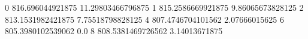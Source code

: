 0 816.696044921875 11.29803466796875
1 815.2586669921875 9.86065673828125
2 813.1531982421875 7.75518798828125
4 807.4746704101562 2.07666015625
6 805.3980102539062 0.0
8 808.5381469726562 3.14013671875
